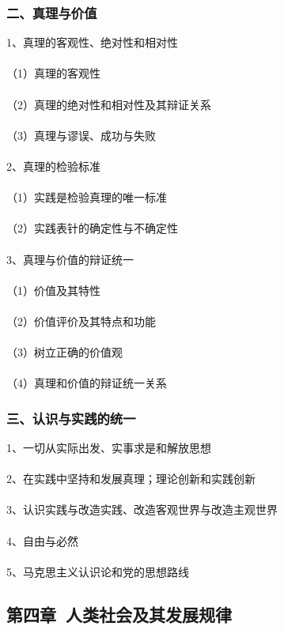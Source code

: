 \documentclass{ctexart}
\begin{document}
\subsubsection{二、真理与价值}
1、真理的客观性、绝对性和相对性
\\\\
（1）真理的客观性
\\\\
（2）真理的绝对性和相对性及其辩证关系
\\\\
（3）真理与谬误、成功与失败
\\\\

2、真理的检验标准
\\\\
（1）实践是检验真理的唯一标准
\\\\
（2）实践表针的确定性与不确定性
\\\\

3、真理与价值的辩证统一
\\\\
（1）价值及其特性
\\\\
（2）价值评价及其特点和功能
\\\\
（3）树立正确的价值观
\\\\
（4）真理和价值的辩证统一关系
\subsubsection{三、认识与实践的统一}
1、一切从实际出发、实事求是和解放思想
\\\\

2、在实践中坚持和发展真理；理论创新和实践创新
\\\\

3、认识实践与改造实践、改造客观世界与改造主观世界
\\\\

4、自由与必然
\\\\

5、马克思主义认识论和党的思想路线

\subsection{第四章\ 人类社会及其发展规律}
\end{document}
